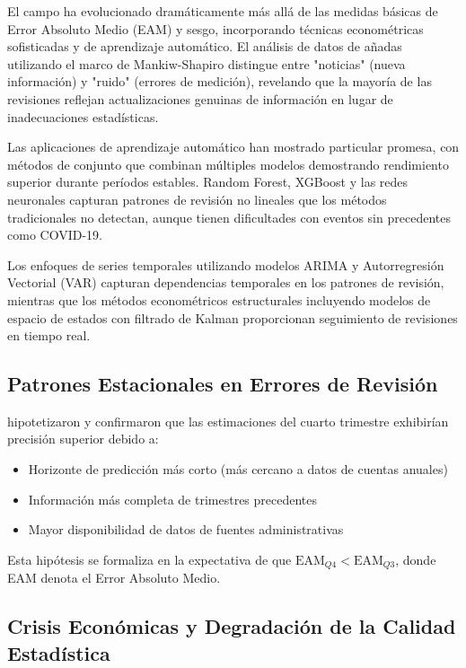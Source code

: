 \documentclass{article}
\begin{document}
El campo ha evolucionado dramáticamente más allá de las medidas básicas de Error Absoluto Medio (EAM) y sesgo, incorporando técnicas econométricas sofisticadas y de aprendizaje automático. El análisis de datos de añadas utilizando el marco de Mankiw-Shapiro distingue entre "noticias" (nueva información) y "ruido" (errores de medición), revelando que la mayoría de las revisiones reflejan actualizaciones genuinas de información en lugar de inadecuaciones estadísticas.

Las aplicaciones de aprendizaje automático han mostrado particular promesa, con métodos de conjunto que combinan múltiples modelos demostrando rendimiento superior durante períodos estables. Random Forest, XGBoost y las redes neuronales capturan patrones de revisión no lineales que los métodos tradicionales no detectan, aunque tienen dificultades con eventos sin precedentes como COVID-19.

Los enfoques de series temporales utilizando modelos ARIMA y Autorregresión Vectorial (VAR) capturan dependencias temporales en los patrones de revisión, mientras que los métodos econométricos estructurales incluyendo modelos de espacio de estados con filtrado de Kalman proporcionan seguimiento de revisiones en tiempo real.

\subsection{Patrones Estacionales en Errores de Revisión}

\citet{pavia2017} hipotetizaron y confirmaron que las estimaciones del cuarto trimestre exhibirían precisión superior debido a:

\begin{itemize}
\item Horizonte de predicción más corto (más cercano a datos de cuentas anuales)
\item Información más completa de trimestres precedentes
\item Mayor disponibilidad de datos de fuentes administrativas
\end{itemize}

Esta hipótesis se formaliza en la expectativa de que $\text{EAM}_{Q4} < \text{EAM}_{Q3}$, donde EAM denota el Error Absoluto Medio.

\subsection{Crisis Económicas y Degradación de la Calidad Estadística}
\end{document}
